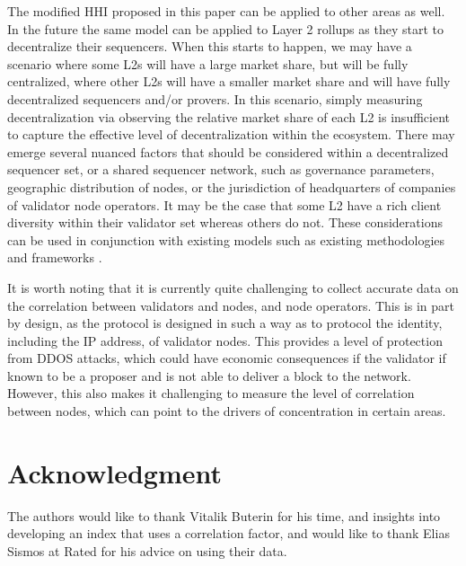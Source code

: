 \documentclass[conference]{IEEEtran}
\begin{document}
The modified HHI proposed in this paper can be applied to other areas as well.  In the future the same model can be applied to Layer 2 rollups as they start to decentralize their sequencers.  When this starts to happen, we may have a scenario where some L2s will have a large market share, but will be fully centralized, where other L2s will have a smaller market share and will have fully decentralized sequencers and/or provers.  In this scenario, simply measuring decentralization via observing the relative market share of each L2 is insufficient to capture the effective level of decentralization within the ecosystem.  There may emerge several nuanced factors that should be considered within a decentralized sequencer set, or a shared sequencer network, such as governance parameters, geographic distribution of nodes, or the jurisdiction of headquarters of companies of validator node operators.  It may be the case that some L2 have a rich client diversity within their validator set whereas others do not.  These considerations can be used in conjunction with existing models such as existing methodologies and frameworks \cite{l2beat2024}.

It is worth noting that it is currently quite challenging to collect accurate data on the  correlation between validators and nodes, and node operators.  This is in part by design, as the protocol is designed in such a way as to protocol the identity, including the IP address, of validator nodes.  This provides a level of protection from DDOS attacks, which could have economic consequences if the validator if known to be a proposer and is not able to deliver a block to the network.  However, this also makes it challenging to measure the level of correlation between nodes, which can point to the drivers of concentration in certain areas.

\section*{Acknowledgment}

The authors would like to thank Vitalik Buterin for his time, and insights into developing an index that uses a correlation factor, and would like to thank Elias Sismos at Rated for his advice on using their data.

\printbibliography
\end{document}
